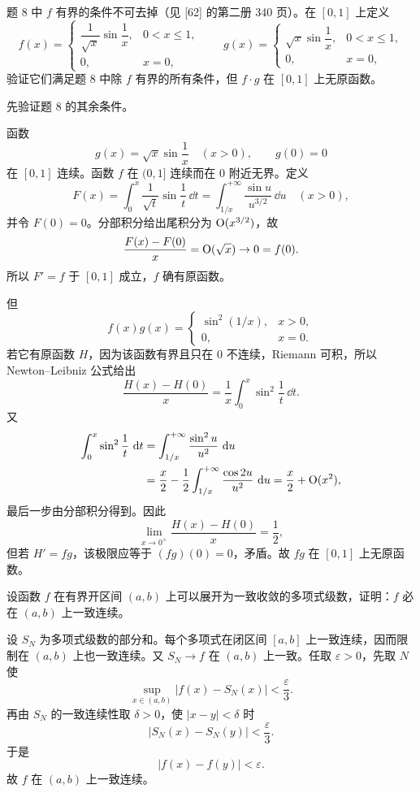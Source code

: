 \begin{xreferenceproblem}[10]
题 8 中 $f$ 有界的条件不可去掉（见 [62] 的第二册 340 页）。在 $[0,1]$ 上定义
\[
  f(x)=
  \begin{cases}
    \dfrac1{\sqrt x}\sin\dfrac1x,&0<x\leqslant1,\\
    0,&x=0,
  \end{cases}
  \qquad
  g(x)=
  \begin{cases}
    \sqrt x\sin\dfrac1x,&0<x\leqslant1,\\
    0,&x=0,
  \end{cases}
\]
验证它们满足题 8 中除 $f$ 有界的所有条件，但 $f\cdot g$ 在 $[0,1]$ 上无原函数。
\end{xreferenceproblem}
\begin{xsolution}
先验证题 8 的其余条件。

函数
\[
  g(x)=\sqrt x\sin\frac1x\quad(x>0),\qquad g(0)=0
\]
在 $[0,1]$ 连续。函数 $f$ 在 $(0,1]$ 连续而在 $0$ 附近无界。定义
\[
  F(x)=\int_0^x\frac1{\sqrt t}\sin\frac1t\,\dd t
  =\int_{1/x}^{+\infty}\frac{\sin u}{u^{3/2}}\,\dd u
  \quad(x>0),
\]
并令 $F(0)=0$。分部积分给出尾积分为 $\mathrm{O}(x^{3/2})$，故
\[
  \frac{F(x)-F(0)}x=\mathrm{O}(\sqrt x)\to0=f(0).
\]
所以 $F'=f$ 于 $[0,1]$ 成立，$f$ 确有原函数。

但
\[
  f(x)g(x)=
  \begin{cases}
    \sin^2(1/x),&x>0,\\
    0,&x=0.
  \end{cases}
\]
若它有原函数 $H$，因为该函数有界且只在 $0$ 不连续，Riemann 可积，所以 Newton--Leibniz 公式给出
\[
  \frac{H(x)-H(0)}x
  =\frac1x\int_0^x\sin^2\frac1t\,\dd t.
\]
又
\[
\begin{aligned}
  \int_0^x\sin^2\frac1t\,\mathop{}\!\mathrm{d} t
  &=\int_{1/x}^{+\infty}\frac{\sin^2u}{u^2}\,\mathop{}\!\mathrm{d} u\\
  &=\frac x2-\frac12\int_{1/x}^{+\infty}\frac{\cos2u}{u^2}\,\mathop{}\!\mathrm{d} u
  =\frac x2+\mathrm{O}(x^2),
\end{aligned}
\]
最后一步由分部积分得到。因此
\[
  \lim_{x\to0^+}\frac{H(x)-H(0)}x=\frac12,
\]
但若 $H'=fg$，该极限应等于 $(fg)(0)=0$，矛盾。故 $fg$ 在 $[0,1]$ 上无原函数。
\end{xsolution}


\begin{xreferenceproblem}[11]
设函数 $f$ 在有界开区间 $(a,b)$ 上可以展开为一致收敛的多项式级数，证明：$f$ 必在 $(a,b)$ 上一致连续。
\end{xreferenceproblem}
\begin{xsolution}
设 $S_N$ 为多项式级数的部分和。每个多项式在闭区间 $[a,b]$ 上一致连续，因而限制在 $(a,b)$ 上也一致连续。又 $S_N\to f$ 在 $(a,b)$ 上一致。任取 $\varepsilon>0$，先取 $N$ 使
\[
  \sup_{x\in(a,b)}|f(x)-S_N(x)|<\frac\varepsilon3.
\]
再由 $S_N$ 的一致连续性取 $\delta>0$，使 $|x-y|<\delta$ 时
\[
  |S_N(x)-S_N(y)|<\frac\varepsilon3.
\]
于是
\[
  |f(x)-f(y)|<\varepsilon.
\]
故 $f$ 在 $(a,b)$ 上一致连续。
\end{xsolution}


